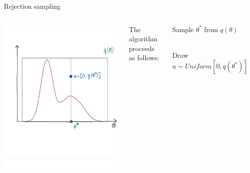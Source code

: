 \documentclass[compress]{beamer}
\begin{document}
\begin{frame}[label=sec-5-5]{Rejection sampling}
\begin{columns}[c] 
\includegraphics[width=1\linewidth]{RS4}

The algorithm proceeds as follows:\\
\begin{enumerate}
\item Sample $\theta^*$ from $q(\theta)$ \\~\\
\item Draw $u \sim Uniform[0, q(\theta^*)]$ \\~\\
\textcolor{white}{
\item[\color{white}] Evaluate $f(\theta^*)$ \\~\\
\item[\color{white}]If $f(\theta^*) > u$ accept, else reject \\~\\
\item[\color{white}] Repeat steps 1-4
}
\end{enumerate}
\end{columns}
\end{frame}
\end{document}
